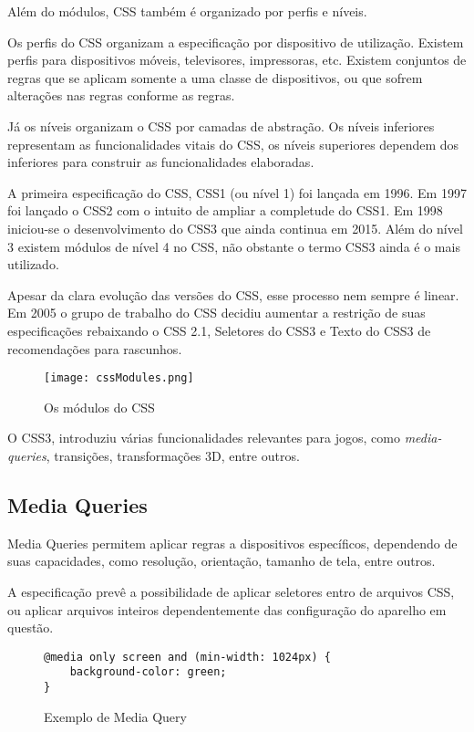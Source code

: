 Além do módulos, CSS também é organizado por perfis e níveis.

Os perfis do CSS organizam a especificação por dispositivo de utilização.
Existem perfis para dispositivos móveis, televisores, impressoras, etc.
Existem conjuntos de regras que se aplicam somente a uma classe de dispositivos,
ou que sofrem alterações nas regras conforme as regras.

Já os níveis organizam o CSS por camadas de abstração. Os níveis
inferiores representam as funcionalidades vitais do CSS, os níveis
superiores dependem dos inferiores para construir as funcionalidades
elaboradas.

A primeira especificação do CSS, CSS1 (ou nível 1) foi lançada em
1996. Em 1997 foi lançado o CSS2 com o intuito de ampliar a completude
do CSS1. Em 1998 iniciou-se o desenvolvimento do CSS3 que ainda continua
em 2015. Além do nível 3 existem módulos de nível 4 no CSS, não
obstante o termo CSS3 ainda é o mais utilizado.

Apesar da clara evolução das versões do CSS, esse processo nem
sempre é linear. Em 2005 o grupo de trabalho do CSS decidiu aumentar a
restrição de suas especificações rebaixando o CSS 2.1, Seletores do
CSS3 e Texto do CSS3 de recomendações para rascunhos.

\begin{figure}
    \centering
    \texttt{[image: cssModules.png]}
    \caption{Os módulos do CSS}
\end{figure}

O CSS3, introduziu várias funcionalidades relevantes para jogos, como
\textit{media-queries}, transições, transformações 3D, entre outros.

\subsection{Media Queries}

Media Queries permitem aplicar regras a dispositivos específicos,
dependendo de suas capacidades, como resolução, orientação, tamanho
de tela, entre outros.

A especificação prevê a possibilidade de aplicar seletores entro
de arquivos CSS, ou aplicar arquivos inteiros dependentemente das
configuração do aparelho em questão.

\begin{figure}
\centering
\begin{verbatim}
@media only screen and (min-width: 1024px) {
    background-color: green;
}
\end{verbatim}
\caption{Exemplo de Media Query}
\label{fig:MediaQuery}
\end{figure}

